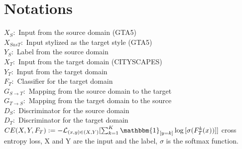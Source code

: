 \documentclass{article}
\begin{document}
\section{Notations}
$X_S: $ Input from the source domain (GTA5)\\
$X_{SasT}: $ Input stylized as the target style (GTA5)\\
$Y_S: $ Label from the source domain \\
$X_T: $ Input from the target domain (CITYSCAPES)\\
$Y_T: $ Input from the target domain\\
$F_T: $ Classifier for the target domain\\
$G_{S\rightarrow T}: $ Mapping from the source domain to the target\\
$G_{T\rightarrow S}: $ Mapping from the target domain to the source\\
$D_S:$ Discriminator for the source domain\\
$D_T:$ Discriminator for the target domain\\
$CE(X, Y, F_T): = -\mathcal{L}_{(x,y) \in (X,Y)}{[\sum_{k=1}^{K} \mathbbm{1}_{[y=k]} \log{[\sigma (F_T^{k}(x))]} ]}$ cross entropy loss, X and Y are the input and the label, $\sigma$ is the softmax function.
\end{document}
